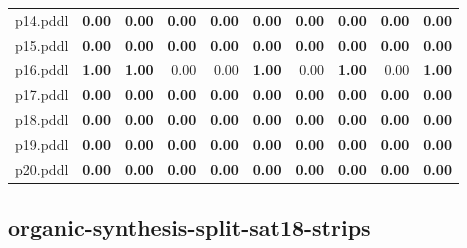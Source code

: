 \documentclass{article}
\begin{document}
\begin{tabular}{@{}lrrrrrrrrr@{}}
p14.pddl & \textbf{0.00} & \textbf{0.00} & \textbf{0.00} & \textbf{0.00} & \textbf{0.00} & \textbf{0.00} & \textbf{0.00} & \textbf{0.00} & \textbf{0.00} \\
p15.pddl & \textbf{0.00} & \textbf{0.00} & \textbf{0.00} & \textbf{0.00} & \textbf{0.00} & \textbf{0.00} & \textbf{0.00} & \textbf{0.00} & \textbf{0.00} \\
p16.pddl & \textbf{1.00} & \textbf{1.00} & 0.00 & 0.00 & \textbf{1.00} & 0.00 & \textbf{1.00} & 0.00 & \textbf{1.00} \\
p17.pddl & \textbf{0.00} & \textbf{0.00} & \textbf{0.00} & \textbf{0.00} & \textbf{0.00} & \textbf{0.00} & \textbf{0.00} & \textbf{0.00} & \textbf{0.00} \\
p18.pddl & \textbf{0.00} & \textbf{0.00} & \textbf{0.00} & \textbf{0.00} & \textbf{0.00} & \textbf{0.00} & \textbf{0.00} & \textbf{0.00} & \textbf{0.00} \\
p19.pddl & \textbf{0.00} & \textbf{0.00} & \textbf{0.00} & \textbf{0.00} & \textbf{0.00} & \textbf{0.00} & \textbf{0.00} & \textbf{0.00} & \textbf{0.00} \\
p20.pddl & \textbf{0.00} & \textbf{0.00} & \textbf{0.00} & \textbf{0.00} & \textbf{0.00} & \textbf{0.00} & \textbf{0.00} & \textbf{0.00} & \textbf{0.00} \\
\end{tabular}

\hypertarget{quality-organic-synthesis-split-sat18-strips}{}
\subsection*{organic-synthesis-split-sat18-strips}
\end{document}
